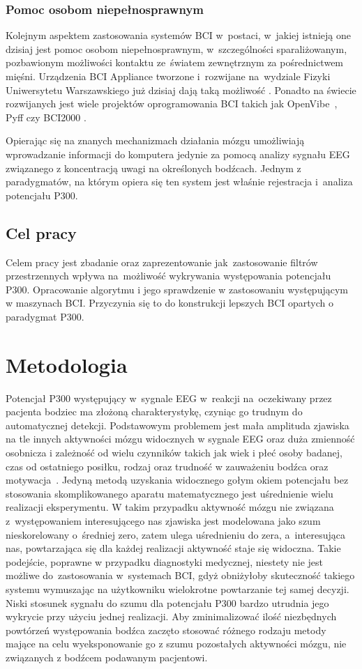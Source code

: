 \documentclass[licencjacka,openright]{pracamgr}
\begin{document}
\subsection{Pomoc osobom niepełnosprawnym}
Kolejnym aspektem zastosowania systemów BCI w~postaci, w~jakiej istnieją one dzisiaj jest pomoc osobom niepełnosprawnym, w~szczególności sparaliżowanym, pozbawionym możliwości kontaktu ze~światem zewnętrznym za pośrednictwem mięśni. Urządzenia BCI Appliance tworzone i~rozwijane na~wydziale Fizyki Uniwersytetu Warszawskiego już dzisiaj dają taką możliwość \citep{obci}.
Ponadto na świecie rozwijanych jest wiele projektów oprogramowania BCI takich jak OpenVibe~\citep{renard2010}, Pyff \citep{venthur2008} czy BCI2000 \citep{schalk2004}.

Opierając się na znanych mechanizmach działania mózgu umożliwiają wprowadzanie informacji do komputera jedynie za pomocą analizy sygnału EEG związanego z koncentracją uwagi na określonych bodźcach. Jednym z paradygmatów, na którym opiera się ten system jest właśnie rejestracja i~analiza potencjału P300.

\section{Cel pracy}
Celem pracy jest zbadanie oraz zaprezentowanie jak~zastosowanie filtrów przestrzennych wpływa na~możliwość wykrywania występowania potencjału P300. Opracowanie
algorytmu i jego sprawdzenie w zastosowaniu występującym w maszynach BCI. Przyczynia się to do konstrukcji lepszych BCI opartych o paradygmat P300.

\chapter{Metodologia}
Potencjał P300 występujący w~sygnale EEG w~reakcji na~oczekiwany przez pacjenta bodziec ma złożoną charakterystykę, czyniąc go trudnym do automatycznej detekcji. Podstawowym problemem jest mała amplituda zjawiska na tle innych aktywności mózgu widocznych w sygnale EEG oraz duża zmienność osobnicza i zależność od wielu czynników takich jak wiek i płeć osoby badanej, czas od ostatniego posiłku, rodzaj oraz trudność w zauważeniu bodźca oraz motywacja~\citep{chudzik2004}.
Jedyną metodą uzyskania widocznego gołym okiem potencjału bez stosowania skomplikowanego aparatu matematycznego jest uśrednienie wielu realizacji eksperymentu. W takim przypadku aktywność mózgu nie związana z~występowaniem interesującego nas zjawiska jest modelowana jako szum nieskorelowany o~średniej zero, zatem ulega uśrednieniu do zera, a~interesująca nas, powtarzająca się dla każdej realizacji aktywność staje się widoczna. Takie podejście, poprawne w przypadku diagnostyki medycznej, niestety nie jest możliwe do~zastosowania w~systemach BCI, gdyż obniżyłoby skuteczność takiego systemu wymuszając na użytkowniku wielokrotne powtarzanie tej samej decyzji. Niski stosunek sygnału do szumu dla potencjału P300 bardzo utrudnia jego wykrycie przy użyciu jednej realizacji. Aby zminimalizować ilość niezbędnych powtórzeń występowania bodźca zaczęto stosować różnego rodzaju metody mające na celu wyeksponowanie go z szumu pozostałych aktywności mózgu, nie związanych z bodźcem podawanym pacjentowi.
\end{document}

